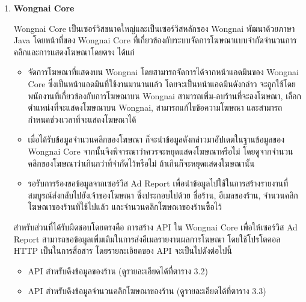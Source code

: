 \begin{enumerate}
	\item \textbf{Wongnai Core}
	
	Wongnai Core เป็นเซอร์วิสขนาดใหญ่และเป็นเซอร์วิสหลักของ Wongnai พัฒนาด้วยภาษา Java โดยหน้าที่ของ Wongnai Core ที่เกี่ยวข้องกับระบบจัดการโฆษณาแบบจำกัดจำนวนการคลิกและการแสดงโฆษณาโดยตรง ได้แก่
	
	\begin{itemize}
		\item จัดการโฆษณาที่แสดงบน Wongnai โดยสามารถจัดการได้จากหน้าแอดมินของ Wongnai Core ซึ่งเป็นหน้าแอดมินที่ใช้งานมานานแล้ว โดยจะเป็นหน้าแอดมินดังกล่าว จะถูกใช้โดยพนักงานที่เกี่ยวข้องกับการโฆษณาบน Wongnai สามารถเพิ่ม-ลบร้านที่จะลงโฆษณา, เลือกตำแหน่งที่จะแสดงโฆษณาบน Wongnai, สามารถแก้ไขข้อความโฆษณา และสามารถกำหนดช่วงเวลาที่จะแสดงโฆษณาได้
		\item เมื่อได้รับข้อมูลจำนวนคลิกของโฆษณา ก็จะนำข้อมูลดังกล่าวมาอัปเดตในฐานข้อมูลของ Wongnai Core จากนั้นจึงพิจารณาว่าควรจะหยุดแสดงโฆษณาหรือไม่ โดยดูจากจำนวนคลิกของโฆษณาว่าเกินกว่าที่จำกัดไว้หรือไม่ ถ้าเกินก็จะหยุดแสดงโฆษณานั้น
		\item รอรับการร้องขอข้อมูลจากเซอร์วิส Ad Report เพื่อนำข้อมูลไปใช้ในการสร้างรายงานที่สมบูรณ์ส่งกลับไปยังเจ้าของโฆษณา ซึ่งประกอบไปด้วย ชื่อร้าน, อีเมลของร้าน, จำนวนคลิกโฆษณาของร้านที่ใช้ไปแล้ว และจำนวนคลิกโฆษณาของร้านซื้อไว้
	\end{itemize}

	สำหรับส่วนที่ได้รับผิดชอบโดยตรงคือ การสร้าง API ใน Wongnai Core เพื่อให้เซอร์วิส Ad Report สามารถขอข้อมูลเพิ่มเติมในการส่งอีเมลรายงานผลการโฆษณา โดยใช้โปรโตคอล HTTP เป็นในการสื่อสาร โดยรายละเอียดของ API  จะเป็นไปดังต่อไปนี้
	
	\begin{itemize}
		\item API สำหรับดึงข้อมูลของร้าน (ดูรายละเอียดได้ที่ตาราง 3.2)
		\item API สำหรับดึงข้อมูลจำนวนคลิกโฆษณาของร้าน  (ดูรายละเอียดได้ที่ตาราง 3.3)
		

\end{itemize}
\end{enumerate}
